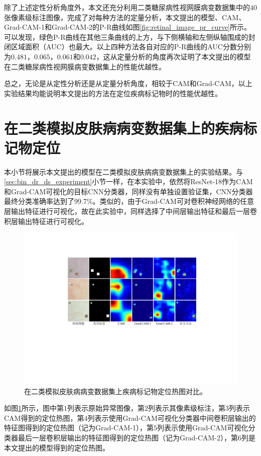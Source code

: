 除了上述定性分析角度外，本文还充分利用二类糖尿病性视网膜病变数据集中的$40$张像素级标注图像，完成了对每种方法的定量分析，本文提出的模型、CAM、Grad-CAM-1和Grad-CAM-2的P-R曲线如图\ref{fig:retinal_image_pr_curve}所示。可以发现，绿色P-R曲线在其他三条曲线的上方，与下侧横轴和左侧纵轴围成的封闭区域面积（AUC）也最大。以上四种方法各自对应的P-R曲线的AUC分数分别为$0.481$，$0.065$，$0.061$和$0.042$，这从定量分析的角度再次证明了本文提出的模型在二类糖尿病性视网膜病变数据集上的性能优越性。

总之，无论是从定性分析还是从定量分析角度，相较于CAM和Grad-CAM，以上实验结果均能说明本文提出的方法在定位疾病标记物时的性能优越性。
\section{在二类模拟皮肤病病变数据集上的疾病标记物定位}\label{sec:bin_simulated_ds_experiment}
本小节将展示本文提出的模型在二类模拟皮肤病病变数据集上的实验结果。与\ref{sec:bin_dr_ds_experiment}小节一样，在本实验中，依然将ResNet-18作为CAM和Grad-CAM可视化的目标CNN分类器，同样没有单独设置验证集，CNN分类器最终分类准确率达到了$99.7\%$。类似的，由于Grad-CAM可对卷积神经网络的任意层输出特征进行可视化，故在此实验中，同样选择了中间层输出特征和最后一层卷积层输出特征进行可视化。
\begin{figure}[h]
	\centering
	\includegraphics[width=1.0\textwidth]{figure/pr_curve_skin_image.pdf}
	\caption[在二类模拟皮肤病病变数据集上疾病标记物定位热图对比]{在二类模拟皮肤病病变数据集上疾病标记物定位热图对比。} 
	\label{fig:simulated_skin}
\end{figure}

如图\ref{fig:simulated_skin}所示，图中第$1$列表示原始异常图像，第$2$列表示其像素级标注，第$3$列表示CAM得到的定位热图，第$4$列表示使用Grad-CAM可视化分类器中间卷积层输出的特征图得到的定位热图（记为Grad-CAM-1），第$5$列表示使用Grad-CAM可视化分类器最后一层卷积层输出的特征图得到的定位热图（记为Grad-CAM-2），第$6$列是本文提出的模型得到的定位热图。

